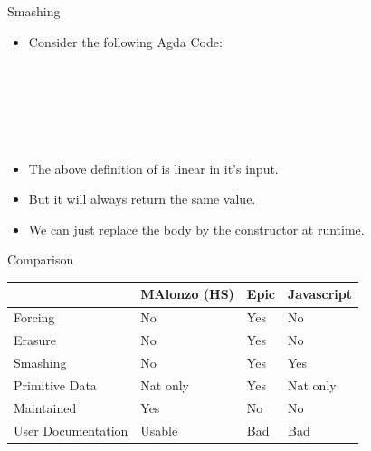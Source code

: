 \begin{frame}[fragile]{Smashing}
\begin{itemize}
\item Consider the following Agda Code:
\end{itemize}
\begin{code}%
\>  \AgdaSymbol{\{} \AgdaSymbol{:} \AgdaSymbol{\}} \AgdaSymbol{(} \AgdaSymbol{:} \AgdaSymbol{)} \AgdaSymbol{:}  \AgdaSymbol{->}  \<%
\\
\>[0]\<[2]%
\>[2] \AgdaSymbol{:}   \<%
\end{code}
\vspace{0.2cm}
\begin{code}%
\> \AgdaSymbol{:} \AgdaSymbol{(}   \AgdaSymbol{:} \AgdaSymbol{)}\<%
\\
\>[2]\<[4]%
\>[4]  \AgdaSymbol{(} \AgdaFunction{+} \AgdaSymbol{(} \AgdaFunction{+} \AgdaSymbol{))} \AgdaSymbol{((} \AgdaFunction{+} \AgdaSymbol{)} \AgdaFunction{+} \AgdaSymbol{)}\<%
\\
\>    \AgdaSymbol{=} \<%
\\
\> \AgdaSymbol{(} \AgdaSymbol{)}   \AgdaSymbol{=}   \AgdaSymbol{(}   \AgdaSymbol{)}\<%
\end{code}
\pause
\begin{itemize}
  \item The above definition of  is linear in it's input.
  \pause \item But it will always return the same value.
  \pause \item We can just replace the body by the  constructor at runtime.
\end{itemize}
\end{frame}

\begin{frame}[fragile]{Comparison}
\begin{tabular}{l | l | l | l}
& MAlonzo (HS) & Epic & Javascript \\
\hline
Forcing & No & Yes & No \\
Erasure & No & Yes & No \\
Smashing & No & Yes & Yes \\
Primitive Data & Nat only & Yes & Nat only \\
\hline
Maintained & Yes & No & No \\
User Documentation & Usable & Bad & Bad \\
\hline
\end{tabular}
\end{frame}
